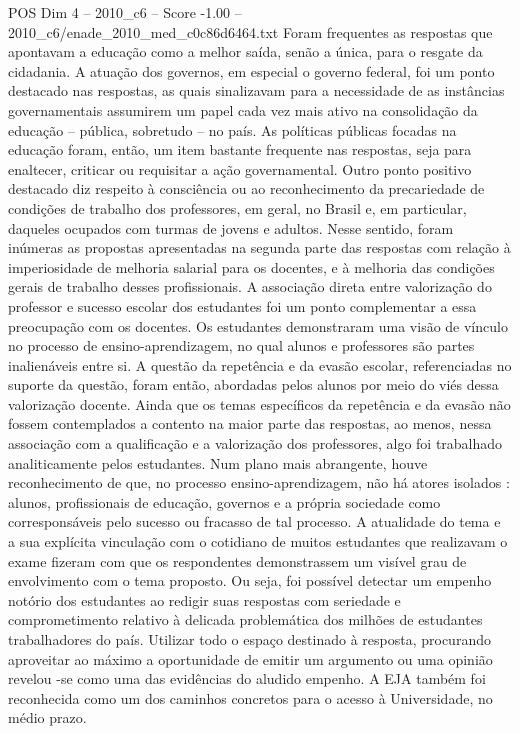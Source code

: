 \begin{textsample}{POS Dim 4 – 2010\_c6 – Score -1.00 – 2010\_c6/enade\_2010\_med\_c0c86d6464.txt}
Foram frequentes as respostas que apontavam a educação como a melhor saída, senão a única, para o resgate da cidadania.
A atuação dos governos, em especial o governo federal, foi um ponto destacado nas respostas, as quais sinalizavam para a necessidade de as instâncias governamentais assumirem um papel cada vez mais ativo na consolidação da educação – pública, sobretudo – no país.
As políticas públicas focadas na educação foram, então, um item bastante frequente nas respostas, seja para enaltecer, criticar ou requisitar a ação governamental.
Outro ponto positivo destacado diz respeito à consciência ou ao reconhecimento da precariedade de condições de trabalho dos professores, em geral, no Brasil e, em particular, daqueles ocupados com turmas de jovens e adultos.
Nesse sentido, foram inúmeras as propostas apresentadas na segunda parte das respostas com relação à imperiosidade de melhoria salarial para os docentes, e à melhoria das condições gerais de trabalho desses profissionais.
A associação direta entre valorização do professor e sucesso escolar dos estudantes foi um ponto complementar a essa preocupação com os docentes.
Os estudantes demonstraram uma visão de vínculo no processo de ensino-aprendizagem, no qual alunos e professores são partes inalienáveis entre si.
A questão da repetência e da evasão escolar, referenciadas no suporte da questão, foram então, abordadas pelos alunos por meio do viés dessa valorização docente.
Ainda que os temas específicos da repetência e da evasão não fossem contemplados a contento na maior parte das respostas, ao menos, nessa associação com a qualificação e a valorização dos professores, algo foi trabalhado analiticamente pelos estudantes.
Num plano mais abrangente, houve reconhecimento de que, no processo ensino-aprendizagem, não há atores isolados : alunos, profissionais de educação, governos e a própria sociedade como corresponsáveis pelo sucesso ou fracasso de tal processo.
A atualidade do tema e a sua explícita vinculação com o cotidiano de muitos estudantes que realizavam o exame fizeram com que os respondentes demonstrassem um visível grau de envolvimento com o tema proposto.
Ou seja, foi possível detectar um empenho notório dos estudantes ao redigir suas respostas com seriedade e comprometimento relativo à delicada problemática dos milhões de estudantes trabalhadores do país.
Utilizar todo o espaço destinado à resposta, procurando aproveitar ao máximo a oportunidade de emitir um argumento ou uma opinião revelou -se como uma das evidências do aludido empenho.
A EJA também foi reconhecida como um dos caminhos concretos para o acesso à Universidade, no médio prazo.

\end{textsample}
